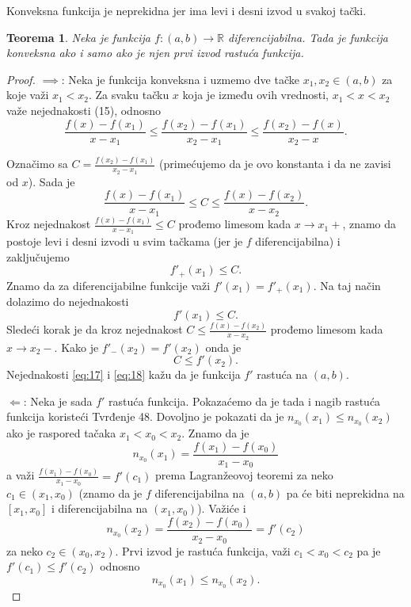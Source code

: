 \documentclass[a4paper,12pt]{article}
\theoremstyle{plain}
\newtheorem{theorem}{Teorema}[section]
\theoremstyle{definition}
\theoremstyle{remark}
\begin{document}
Konveksna funkcija je neprekidna jer ima levi i desni izvod u svakoj tački.

\begin{theorem} \label{tvrdenje:49}
Neka je funkcija $f: (a,b) \to \mathbb{R}$ diferencijabilna. Tada je funkcija konveksna ako i samo ako je njen prvi izvod rastuća funkcija.
\end{theorem}

\begin{proof}
$\implies$: Neka je funkcija konveksna i uzmemo dve tačke $x_1, x_2 \in (a,b)$ za koje važi $x_1 < x_2$. Za svaku tačku $x$ koja je između ovih vrednosti, $x_1 < x < x_2$ važe nejednakosti (15), odnosno
\begin{equation*}
\frac{f(x) - f(x_1)}{x - x_1} \leq \frac{f(x_2) - f(x_1)}{x_2 - x_1} \leq \frac{f(x_2) - f(x)}{x_2 - x}.
\end{equation*}

Označimo sa $C = \frac{f(x_2)-f(x_1)}{x_2-x_1}$ (primećujemo da je ovo konstanta i da ne zavisi od $x$). Sada je
\begin{equation*}
\frac{f(x) - f(x_1)}{x - x_1} \leq C \leq \frac{f(x) - f(x_2)}{x - x_2}.
\end{equation*}
Kroz nejednakost $\frac{f(x)-f(x_1)}{x-x_1} \leq C$ prođemo limesom kada $x \to x_1+$, znamo da postoje levi i desni izvodi u svim tačkama (jer je $f$ diferencijabilna) i zaključujemo
\begin{equation*}
f'_+(x_1) \leq C.
\end{equation*}
Znamo da za diferencijabilne funkcije važi $f'(x_1) = f'_+(x_1)$. Na taj način dolazimo do nejednakosti
\begin{equation} \label{eq:17}
f'(x_1) \leq C.
\end{equation}
Sledeći korak je da kroz nejednakost $C \leq \frac{f(x)-f(x_2)}{x-x_2}$ prođemo limesom kada $x \to x_2-$. Kako je $f'_-(x_2) = f'(x_2)$ onda je
\begin{equation} \label{eq:18}
C \leq f'(x_2).
\end{equation}
Nejednakosti \eqref{eq:17} i \eqref{eq:18} kažu da je funkcija $f'$ rastuća na $(a,b)$.

$\Longleftarrow$: Neka je sada $f'$ rastuća funkcija. Pokazaćemo da je tada i nagib rastuća funkcija koristeći Tvrđenje 48. Dovoljno je pokazati da je $n_{x_0}(x_1) \leq n_{x_0}(x_2)$ ako je raspored tačaka $x_1 < x_0 < x_2$. Znamo da je
\begin{equation*}
n_{x_0}(x_1) = \frac{f(x_1) - f(x_0)}{x_1 - x_0}
\end{equation*}
a važi $\frac{f(x_1)-f(x_0)}{x_1-x_0} = f'(c_1)$ prema Lagranžeovoj teoremi za neko $c_1 \in (x_1, x_0)$ (znamo da je $f$ diferencijabilna na $(a,b)$ pa će biti neprekidna na $[x_1, x_0]$ i diferencijabilna na $(x_1, x_0)$). Važiće i
\begin{equation*}
n_{x_0}(x_2) = \frac{f(x_2) - f(x_0)}{x_2 - x_0} = f'(c_2)
\end{equation*}
za neko $c_2 \in (x_0, x_2)$. Prvi izvod je rastuća funkcija, važi $c_1 < x_0 < c_2$ pa je $f'(c_1) \leq f'(c_2)$ odnosno
\begin{equation*}
n_{x_0}(x_1) \leq n_{x_0}(x_2).
\end{equation*}
\end{proof}
\end{document}
